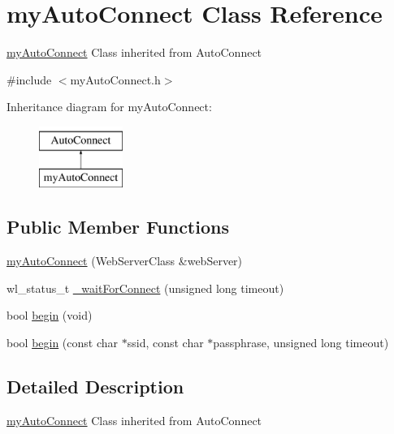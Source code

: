 \hypertarget{classmy_auto_connect}{}\section{my\+Auto\+Connect Class Reference}
\label{classmy_auto_connect}


\mbox{\hyperlink{classmy_auto_connect}{my\+Auto\+Connect}} Class inherited from Auto\+Connect  




{\ttfamily \#include $<$my\+Auto\+Connect.\+h$>$}

Inheritance diagram for my\+Auto\+Connect\+:\begin{figure}[H]
\begin{center}
\leavevmode
\includegraphics[height=2.000000cm]{classmy_auto_connect}
\end{center}
\end{figure}
\subsection*{Public Member Functions}
\begin{DoxyCompactItemize}
\item 
\mbox{\hyperlink{classmy_auto_connect_af01e87d4cd7f2dd7c3ee54f459e7c137}{my\+Auto\+Connect}} (Web\+Server\+Class \&web\+Server)
\item 
wl\+\_\+status\+\_\+t \mbox{\hyperlink{classmy_auto_connect_aa1aaa515c6e27f9fe1073db1122561ca}{\+\_\+wait\+For\+Connect}} (unsigned long timeout)
\item 
bool \mbox{\hyperlink{classmy_auto_connect_aeb57ccef1c16394c297a2ea2fd143f52}{begin}} (void)
\item 
bool \mbox{\hyperlink{classmy_auto_connect_a1e452b4042120cda55722dc3bf220a77}{begin}} (const char $\ast$ssid, const char $\ast$passphrase, unsigned long timeout)
\end{DoxyCompactItemize}


\subsection{Detailed Description}
\mbox{\hyperlink{classmy_auto_connect}{my\+Auto\+Connect}} Class inherited from Auto\+Connect 

